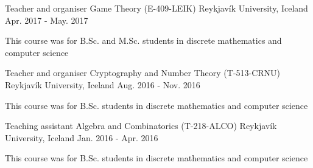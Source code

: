 


\begin{cventries}


\cventry
  {Teacher and organiser} %
  {Game Theory (E-409-LEIK)} %
  {Reykjavík University, Iceland} %
  {Apr. 2017 - May. 2017} %
  {
    \begin{cvitems} %
      \item {This course was for B.Sc. and M.Sc. students in discrete mathematics and computer science}
    \end{cvitems}
  }


  \cventry
    {Teacher and organiser} %
    {Cryptography and Number Theory (T-513-CRNU)} %
    {Reykjavík University, Iceland} %
    {Aug. 2016 - Nov. 2016} %
    {
      \begin{cvitems} %
        \item {This course was for B.Sc. students in discrete mathematics and computer science}
      \end{cvitems}
    }


  \cventry
    {Teaching assistant} %
    {Algebra and Combinatorics (T-218-ALCO)} %
    {Reykjavík University, Iceland} %
    {Jan. 2016 - Apr. 2016} %
    {
      \begin{cvitems} %
        \item {This course was for B.Sc. students in discrete mathematics and computer science}
      \end{cvitems}
    }



\end{cventries}
